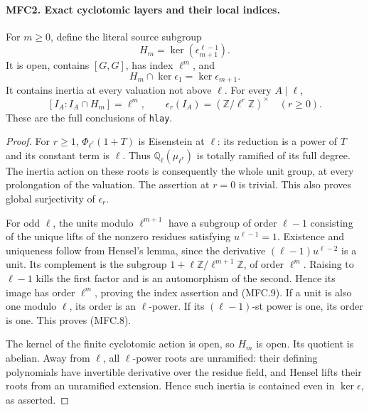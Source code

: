 \documentclass[11pt,a4paper]{article}
\numberwithin{equation}{section}
\theoremstyle{remark}\newtheorem{remark}[theorem]{Remark}
\begin{document}
\paragraph{MFC2. Exact cyclotomic layers and their local indices.}
\label{claim:MFC2}
For \(m\ge0\), define the literal source subgroup
\[
 H_m=\ker(\epsilon_{m+1}^{\ell-1}).                         \tag{MFC.7}
\]
It is open, contains \([G,G]\), has index \(\ell^m\), and
\[
 H_m\cap\ker\epsilon_1=\ker\epsilon_{m+1}.                \tag{MFC.8}
\]
It contains inertia at every valuation not above \(\ell\).
For every \(A\mid\ell\),
\[
 [I_A:I_A\cap H_m]=\ell^m,
 \qquad\epsilon_r(I_A)=(\mathbb Z/\ell^r\mathbb Z)^\times
                         \quad(r\ge0).                    \tag{MFC.9}
\]
These are the full conclusions of \texttt{hlay}.

\begin{proof}
For \(r\ge1\), \(\Phi_{\ell^r}(1+T)\) is Eisenstein at
\(\ell\): its reduction is a power of \(T\) and its constant
term is \(\ell\).  Thus \(\mathbb Q_\ell(\mu_{\ell^r})\)
is totally ramified of its full degree.  The inertia action on
these roots is consequently the whole unit group, at every
prolongation of the valuation.  The assertion at \(r=0\) is
trivial.  This also proves global surjectivity of \(\epsilon_r\).

For odd \(\ell\), the units modulo \(\ell^{m+1}\) have a
subgroup of order \(\ell-1\) consisting of the unique lifts
of the nonzero residues satisfying \(u^{\ell-1}=1\).
Existence and uniqueness follow from Hensel's lemma, since the
derivative \((\ell-1)u^{\ell-2}\) is a unit.  Its complement
is the subgroup \(1+\ell\mathbb Z/\ell^{m+1}\mathbb Z\),
of order \(\ell^m\).  Raising to \(\ell-1\) kills the first
factor and is an automorphism of the second.  Hence its image
has order \(\ell^m\), proving the index assertion and (MFC.9).
If a unit is also one modulo \(\ell\), its order is an
\(\ell\)-power.  If its \((\ell-1)\)-st power is one, its
order is one.  This proves (MFC.8).

The kernel of the finite cyclotomic action is open, so \(H_m\)
is open.  Its quotient is abelian.  Away from \(\ell\), all
\(\ell\)-power roots are unramified: their defining polynomials
have invertible derivative over the residue field, and Hensel
lifts their roots from an unramified extension.  Hence such
inertia is contained even in \(\ker\epsilon\), as asserted.
\end{proof}

\end{document}
